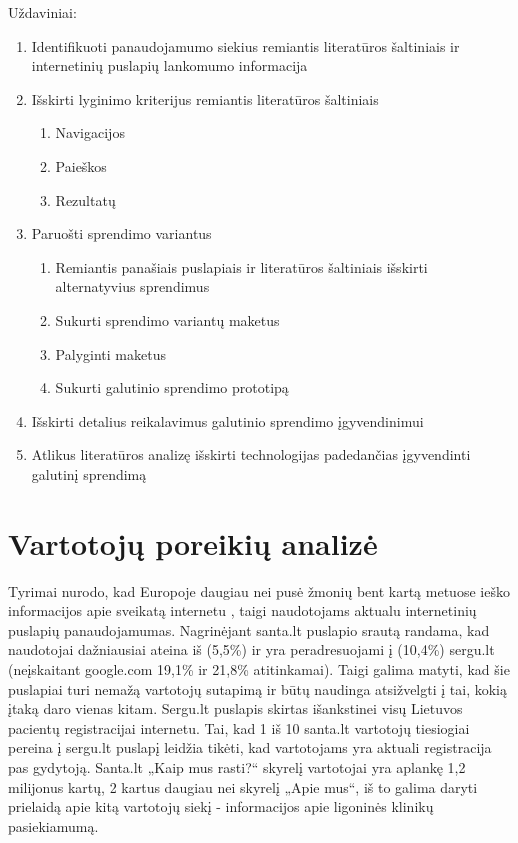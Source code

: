 \documentclass{VUMIFPSkursinis}
\begin{document}
Uždaviniai:
\begin{enumerate}
	\item Identifikuoti panaudojamumo siekius remiantis literatūros šaltiniais ir internetinių puslapių lankomumo informacija
	\item Išskirti lyginimo kriterijus remiantis literatūros šaltiniais
	\renewcommand*{\theenumii}{\theenumi.\arabic{enumii}}
	\renewcommand{\labelenumii}{\theenumii}
	\begin{enumerate}
		\item Navigacijos
		\item Paieškos
		\item Rezultatų
	\end{enumerate}
	\item Paruošti sprendimo variantus
	\begin{enumerate}
		\item Remiantis panašiais puslapiais ir literatūros šaltiniais išskirti alternatyvius sprendimus
		\item Sukurti sprendimo variantų maketus
		\item Palyginti maketus
		\item Sukurti galutinio sprendimo prototipą
	\end{enumerate}
	\item Išskirti detalius reikalavimus galutinio sprendimo įgyvendinimui
	\item Atlikus literatūros analizę išskirti technologijas padedančias įgyvendinti galutinį sprendimą
\end{enumerate}

\section{Vartotojų poreikių analizė}
Tyrimai nurodo, kad Europoje daugiau nei pusė žmonių bent kartą metuose ieško informacijos apie sveikatą internetu \cite{EuCitizDigHealthEn}, taigi naudotojams aktualu internetinių puslapių panaudojamumas. Nagrinėjant santa.lt puslapio srautą randama, kad naudotojai dažniausiai ateina iš (5,5\%) ir yra peradresuojami į (10,4\%) sergu.lt (neįskaitant google.com 19,1\% ir 21,8\% atitinkamai)\cite{AlexaSantaEn}. Taigi galima matyti, kad šie puslapiai turi nemažą vartotojų sutapimą ir būtų naudinga atsižvelgti į tai, kokią įtaką daro vienas kitam. Sergu.lt puslapis skirtas išankstinei visų Lietuvos pacientų registracijai internetu. Tai, kad 1 iš 10 santa.lt vartotojų tiesiogiai pereina į sergu.lt puslapį leidžia tikėti, kad vartotojams yra aktuali registracija pas gydytoją. Santa.lt „Kaip mus rasti?“ skyrelį vartotojai yra aplankę 1,2 milijonus kartų\cite{VulSkKaipMusRastiLt}, 2 kartus daugiau nei skyrelį „Apie mus“\cite{VulSkApieMusLt}, iš to galima daryti prielaidą apie kitą vartotojų siekį - informacijos apie ligoninės klinikų pasiekiamumą.
\vspace{0,5cm}
\end{document}
